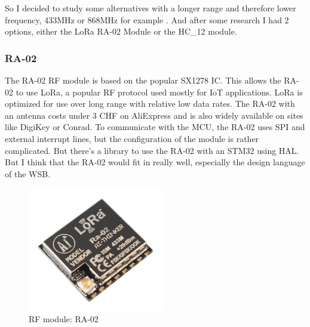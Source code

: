 So I decided to study some alternatives with a longer range and therefore lower frequency, 433MHz or 868MHz for example \cite{RF_Modules_Comparison}. And after some research I had 2 options, either the LoRa RA-02 Module or the HC\_12 module.

\subsubsection{RA-02}
The RA-02 RF module is based on the popular SX1278 IC. This allows the RA-02 to use LoRa, a popular RF protocol used mostly for IoT applications. LoRa is optimized for use over long range with relative low data rates. The RA-02 with an antenna costs under 3 CHF on AliExpress and is also widely available on sites like DigiKey or Conrad. To communicate with the MCU, the RA-02 uses SPI and external interrupt lines, but the configuration of the module is rather complicated. But there's a library to use the RA-02 with an STM32 using HAL. But I think that the RA-02 would fit in really well, especially the design language of the WSB.
\begin{figure}[H]
	\centering
	\includegraphics[width=6cm]{2_Documentation/Documentation_Wireless_ScoreBoard_Remote/Resources/RA-02.jpg}
	\caption{RF module: RA-02}
	\label{fig:RA-02}
\end{figure}

